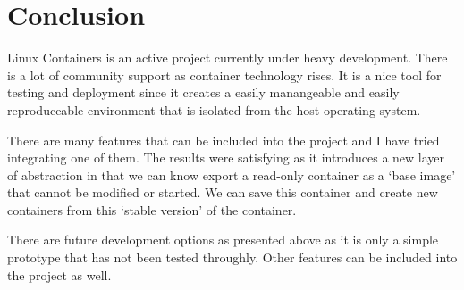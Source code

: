 \documentclass[12pt]{article}
\begin{document}
\section{Conclusion}

Linux Containers is an active project currently under heavy development. There is a lot of community support as container technology rises. It is a nice tool for testing and deployment since it creates a easily manangeable and easily reproduceable environment that is isolated from the host operating system.

There are many features that can be included into the project and I have tried integrating one of them. The results were satisfying as it introduces a new layer of abstraction in that we can know export a read-only container as a `base image' that cannot be modified or started. We can save this container and create new containers from this `stable version' of the container.

There are future development options as presented above as it is only a simple prototype that has not been tested throughly. Other features can be included into the project as well.
\end{document}
